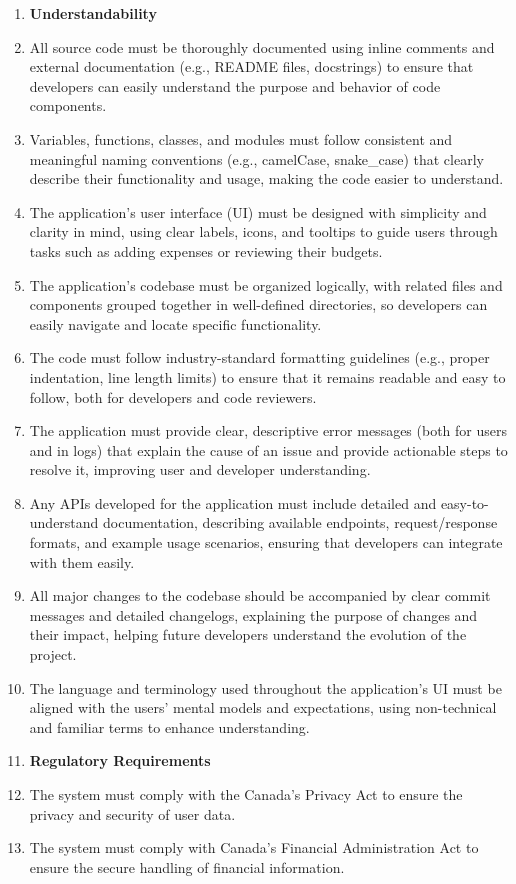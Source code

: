 \documentclass[12pt]{article}
\begin{document}
\begin{enumerate}[label=NFR\arabic*]
  \item[] \textbf{Understandability} 
  \item All source code must be thoroughly documented using inline comments and
  external documentation (e.g., README files, docstrings) to ensure that
  developers can easily understand the purpose and behavior of code components.
  \item Variables, functions, classes, and modules must follow consistent and
  meaningful naming conventions (e.g., camelCase, snake\_case) that clearly
  describe their functionality and usage, making the code easier to understand.
  \item The application's user interface (UI) must be designed with simplicity
  and clarity in mind, using clear labels, icons, and tooltips to guide users
  through tasks such as adding expenses or reviewing their budgets.
  \item The application's codebase must be organized logically, with related
  files and components grouped together in well-defined directories, so
  developers can easily navigate and locate specific functionality.
  \item The code must follow industry-standard formatting guidelines (e.g.,
  proper indentation, line length limits) to ensure that it remains readable and
  easy to follow, both for developers and code reviewers.
  \item The application must provide clear, descriptive error messages (both for
  users and in logs) that explain the cause of an issue and provide actionable
  steps to resolve it, improving user and developer understanding.
  \item Any APIs developed for the application must include detailed and
  easy-to-understand documentation, describing available endpoints,
  request/response formats, and example usage scenarios, ensuring that
  developers can integrate with them easily.
  \item All major changes to the codebase should be accompanied by clear commit
  messages and detailed changelogs, explaining the purpose of changes and their
  impact, helping future developers understand the evolution of the project.
  \item The language and terminology used throughout the application's UI must
  be aligned with the users' mental models and expectations, using non-technical
  and familiar terms to enhance understanding.

  \item[] \textbf{Regulatory Requirements}
  \item The system must comply with the Canada's Privacy Act to ensure the
  privacy and security of user data.
  \item The system must comply with Canada's Financial Administration Act to
  ensure the secure handling of financial information.
  
\end{enumerate}
\end{document}
